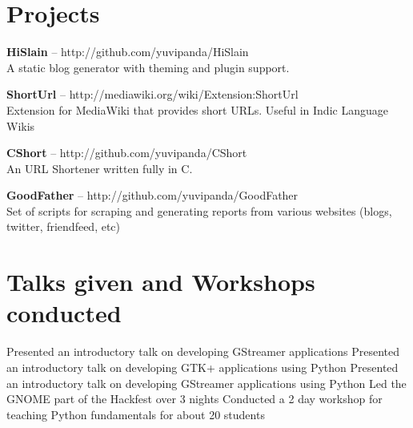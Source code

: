 \documentclass[11pt,a4paper]{moderncv}
\begin{document}
\pagebreak
\section{Projects}

\cvlistitem
{\textbf{HiSlain} -- {\small http://github.com/yuvipanda/HiSlain}
  \\A static blog generator with theming and plugin support.\\
}

\cvlistitem
{\textbf{ShortUrl} -- {\small http://mediawiki.org/wiki/Extension:ShortUrl}
  \\Extension for MediaWiki that provides short URLs. Useful in Indic Language Wikis\\
}

\cvlistitem
{\textbf{CShort} -- {\small http://github.com/yuvipanda/CShort}
  \\An URL Shortener written fully in C.\\
}

\cvlistitem
{\textbf{GoodFather} -- {\small http://github.com/yuvipanda/GoodFather}
  \\Set of scripts for scraping and generating reports from various websites (blogs, twitter, friendfeed, etc)\\
}



\section{Talks given and Workshops conducted}

{Presented an introductory talk on developing GStreamer applications}
{Presented an introductory talk on developing GTK+ applications using Python}
{Presented an introductory talk on developing GStreamer applications using Python}
{Led the GNOME part of the Hackfest over 3 nights}
{Conducted a 2 day workshop for teaching Python fundamentals for about 20 students} 

\end{document}
